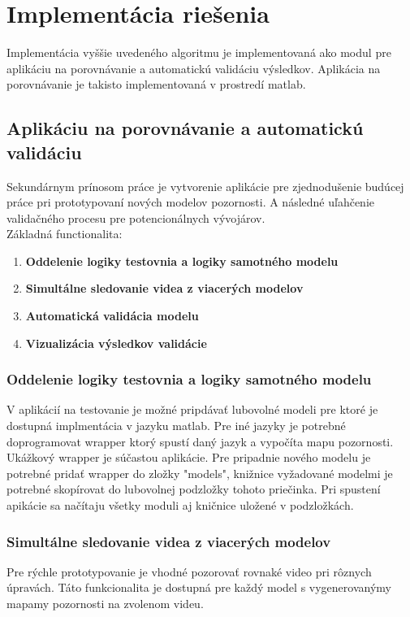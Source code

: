 \section{Implementácia riešenia}
Implementácia vyššie uvedeného algoritmu je implementovaná ako modul pre aplikáciu na porovnávanie a  automatickú validáciu výsledkov.
Aplikácia na porovnávanie je takisto implementovaná v prostredí matlab.

\subsection{Aplikáciu na porovnávanie a automatickú validáciu}
Sekundárnym prínosom práce je vytvorenie aplikácie pre zjednodušenie budúcej práce pri prototypovaní nových modelov pozornosti.
A následné uľahčenie validačného procesu pre potencionálnych vývojárov.\\
Základná functionalita:
\begin{enumerate}
  \item\textbf{Oddelenie logiky testovnia a logiky samotného modelu}
  \item\textbf{Simultálne sledovanie videa z viacerých modelov}
  \item\textbf{Automatická validácia modelu}
  \item\textbf{Vizualizácia výsledkov validácie}
\end{enumerate}

\subsubsection{Oddelenie logiky testovnia a logiky samotného modelu}
V aplikácií na testovanie je možné pripdávať lubovolné modeli pre ktoré je dostupná implmentácia v jazyku matlab.
Pre iné jazyky je potrebné doprogramovat wrapper ktorý spustí daný jazyk a vypočíta mapu pozornosti.
Ukážkový wrapper je súčastou aplikácie.
Pre pripadnie nového modelu je potrebné pridať wrapper do zložky "models", knižnice vyžadované modelmi je potrebné skopírovat do lubovolnej podzložky tohoto priečinka.
Pri spustení apikácie sa načítaju všetky moduli aj kničnice uložené v podzložkách.

\subsubsection{Simultálne sledovanie videa z viacerých modelov}
Pre rýchle prototypovanie je vhodné pozorovať rovnaké video pri rôznych úpravách.
Táto funkcionalita je dostupná pre každý model s vygenerovanýmy mapamy pozornosti na zvolenom videu.

